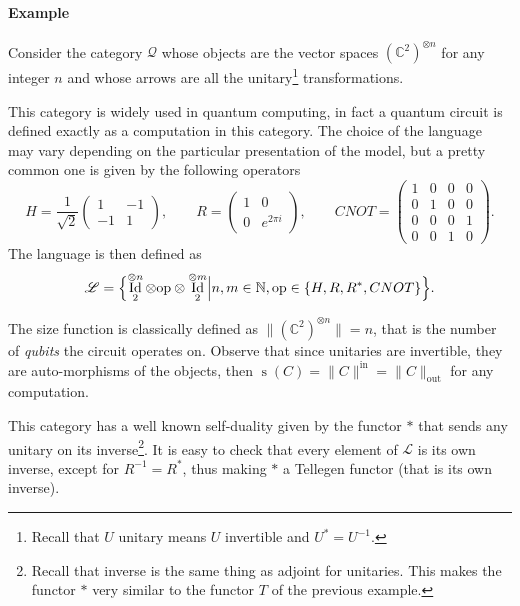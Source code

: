 \documentclass{article}
\newcommand{\cat}[1]{\mathscr{#1}}
\renewcommand{\L}{\cat{L}}
\newcommand{\size}[1]{\lVert#1\rVert}
\newcommand{\sizein}[1]{\size{#1}^\mathrm{in}}
\newcommand{\sizeout}[1]{\size{#1}_\mathrm{out}}
\DeclareMathOperator{\Id}{Id}
\newcommand{\N}{\mathbb{N}}
\newcommand{\Complex}{\mathbb{C}}
\DeclareMathOperator{\Space}{s}
\begin{document}
  \paragraph{Example}
  Consider the category $\cat{Q}$ whose objects are the vector spaces
  $\left(\Complex^2\right)^{\otimes n}$ for any integer $n$ and whose
  arrows are all the unitary\footnote{Recall that $U$ unitary means
    $U$ invertible and $U^\ast=U^{-1}$.} transformations.
  
  This category is widely used in quantum computing, in fact a quantum
  circuit is defined exactly as a computation in this category. The
  choice of the language may vary depending on the particular
  presentation of the model, but a pretty common one is given by the
  following operators
  \begin{equation*}
    H = \frac{1}{\sqrt{2}}\begin{pmatrix}
      1 & -1 \\ -1 & 1
    \end{pmatrix},
    \qquad
    R = \begin{pmatrix}
      1 & 0 \\ 0 & e^{2\pi i }
    \end{pmatrix},
    \qquad
    CNOT = \begin{pmatrix}
      1 & 0 & 0 & 0\\
      0 & 1 & 0 & 0\\
      0 & 0 & 0 & 1\\
      0 & 0 & 1 & 0
    \end{pmatrix}.
  \end{equation*}
  The language is then defined as
  \begin{equation*}
    \L = \Bigl\{\Id_2^{\otimes n}\otimes\mathrm{op}\otimes\Id_2^{\otimes m}\Bigl\lvert
    n,m\in\N, \mathrm{op}\in\{H,R,R^\ast,CNOT\} \Bigr\}
    \text{.}
  \end{equation*}
  
  The size function is classically defined as
  $\size{(\Complex^2)^{\otimes n}} = n$, that is the number of
  \emph{qubits} the circuit operates on. Observe that since unitaries
  are invertible, they are auto-morphisms of the objects, then
  $\Space(C) = \sizein{C} = \sizeout{C}$ for any computation.

  This category has a well known self-duality given by the functor
  $\ast$ that sends any unitary on its inverse\footnote{Recall that
    inverse is the same thing as adjoint for unitaries. This makes the
    functor $\ast$ very similar to the functor $T$ of the previous
    example.}. It is easy to check that every element of $\L$ is its
  own inverse, except for $R^{-1} = R^\ast$, thus making $\ast$ a
  Tellegen functor (that is its own inverse).
\end{document}
